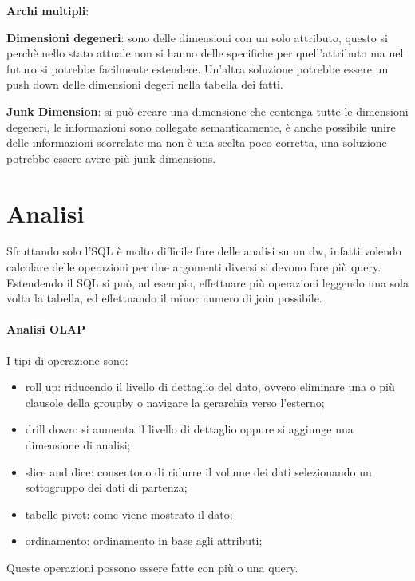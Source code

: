 \documentclass[12pt]{article}
\begin{document}
\textbf{Archi multipli}:


\textbf{Dimensioni degeneri}: sono delle dimensioni con un solo attributo, questo si perch\`e nello stato attuale non si hanno delle specifiche per quell'attributo ma nel futuro si potrebbe facilmente estendere. Un'altra soluzione potrebbe essere un push down delle dimensioni degeri nella tabella dei fatti.

\textbf{Junk Dimension}: si pu\`o creare una dimensione che contenga tutte le dimensioni degeneri, le informazioni sono collegate semanticamente, \`e anche possibile unire delle informazioni scorrelate ma non \`e una scelta poco corretta, una soluzione potrebbe essere avere pi\`u junk dimensions.


\section{Analisi}
Sfruttando solo l'SQL \`e molto difficile fare delle analisi su un dw, infatti volendo calcolare delle operazioni per due argomenti diversi si devono fare pi\`u query. Estendendo il SQL si pu\`o, ad esempio, effettuare pi\`u operazioni leggendo una sola volta la tabella, ed effettuando il minor numero di join possibile.

\paragraph{Analisi OLAP}
I tipi di operazione sono:
\begin{itemize}
    \item roll up: riducendo il livello di dettaglio del dato, ovvero eliminare una o pi\`u clausole della groupby o navigare la gerarchia verso l'esterno;
    \item drill down: si aumenta il livello di dettaglio oppure si aggiunge una dimensione di analisi;
    \item slice and dice: consentono di ridurre il volume dei dati selezionando un sottogruppo dei dati di partenza;
    \item tabelle pivot: come viene mostrato il dato;
    \item ordinamento: ordinamento in base agli attributi;
\end{itemize}
Queste operazioni possono essere fatte con pi\`u o una query.
\end{document}
